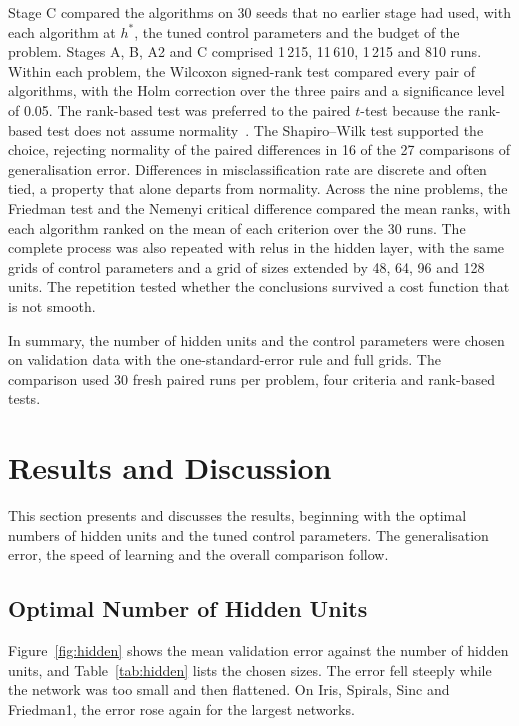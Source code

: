 \documentclass[conference]{IEEEtran}
\begin{document}
Stage C compared the algorithms on 30 seeds that no earlier stage had used, with
each algorithm at $h^*$, the tuned control parameters and the budget of the problem.
Stages A, B, A2 and C comprised 1\,215, 11\,610, 1\,215 and 810 runs. Within each
problem, the Wilcoxon signed-rank test compared every pair of algorithms, with the
Holm correction over the three pairs and a significance level of 0.05. The
rank-based test was preferred to the paired $t$-test because the rank-based test
does not assume normality~\cite{demsar2006}. The Shapiro--Wilk test supported the
choice, rejecting normality of the paired differences in 16 of the 27 comparisons
of generalisation error. Differences in misclassification rate are discrete and
often tied, a property that alone departs from normality. Across the nine problems,
the Friedman test and the Nemenyi critical difference compared the mean ranks,
with each algorithm ranked on the mean of each criterion over the 30 runs. The
complete process was also repeated with \glspl{relu} in the hidden layer, with the
same grids of control parameters and a grid of sizes extended by 48, 64, 96 and
128 units. The repetition tested whether the conclusions survived a cost function
that is not smooth.

In summary, the number of hidden units and the control parameters were chosen on
validation data with the one-standard-error rule and full grids. The comparison
used 30 fresh paired runs per problem, four criteria and rank-based tests.

\section{Results and Discussion}

This section presents and discusses the results, beginning with the optimal
numbers of hidden units and the tuned control parameters. The generalisation
error, the speed of learning and the overall comparison follow.

\subsection{Optimal Number of Hidden Units}

Figure~\ref{fig:hidden} shows the mean validation error against the number of
hidden units, and Table~\ref{tab:hidden} lists the chosen sizes. The error fell
steeply while the network was too small and then flattened. On Iris, Spirals, Sinc
and Friedman1, the error rose again for the largest networks.
\end{document}
